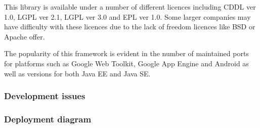 \documentclass[pdftex,11pt,a4paper]{article}
\begin{document}
This library is available under a number of different licences including CDDL ver 1.0, LGPL ver 2.1, LGPL ver 3.0 and EPL ver 1.0. Some larger companies may have difficulty with these licences due to the lack of freedom licences like BSD or Apache offer.

The popularity of this framework is evident in the number of maintained ports for platforms such as Google Web Toolkit, Google App Engine and Android as well as versions for both Java EE and Java SE.

\subsubsection{Development issues}




\subsubsection{Deployment diagram}


\pagebreak


\def\refname{}


\end{document}
